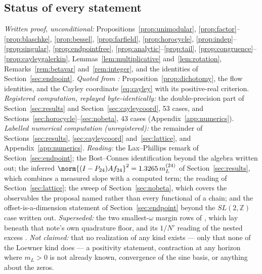 \subsection{Status of every statement}

\emph{Written proof, unconditional:} Propositions~\ref{prop:unimodular},
\ref{prop:factor}--\ref{prop:blaschke}, \ref{prop:bessel}, \ref{prop:farfield},
\ref{prop:horocycle}, \ref{prop:indep}--\ref{prop:singular},
\ref{prop:endpointfree}, \ref{prop:analytic}--\ref{prop:tail},
\ref{prop:congruence}--\ref{prop:cayleygalerkin},
Lemmas~\ref{lem:multiplicative} and~\ref{lem:rotation}, Remarks~\ref{rem:betavar} and~\ref{rem:integer},
and the identities of Section~\ref{sec:endpoint}.
\emph{Quoted from \cite{WilsonLines}:} Proposition~\ref{prop:dichotomy}, the
flow identities, and the Cayley coordinate \eqref{eq:cayley} with its
positive-real criterion. \emph{Registered computation, replayed
byte-identically:} the double-precision part of Section~\ref{sec:results} and
Section~\ref{sec:cayleycoord}, 53 cases, and
Sections~\ref{sec:horocycle}--\ref{sec:nobeta}, 43 cases
(Appendix~\ref{app:numerics}).
\emph{Labelled numerical computation (unregistered):} the remainder of
Sections~\ref{sec:results}, \ref{sec:cayleycoord} and~\ref{sec:lattice}, and
Appendix~\ref{app:numerics}. \emph{Reading:} the Lax--Phillips remark of
Section~\ref{sec:endpoint}; the Bost--Connes identification beyond the algebra
written out; the inferred $\norm{(I-P_{24})Af_{24}}^2=1.3265\,m_L^{(24)}$ of
Section~\ref{sec:results}, which combines a measured slope with a computed term;
the reading of Section~\ref{sec:lattice}; the sweep of
Section~\ref{sec:nobeta}, which covers the observables the proposal named rather
than every functional of a chain; and the offset-is-a-dimension statement of
Section~\ref{sec:endpoint} beyond the $SL(2,\mathbb Z)$ case written out. \emph{Superseded:} the two
smallest-$\omega$ margin rows of \cite[Table~3.1]{ContractionNote}, which lay
beneath that note's own quadrature floor, and its $1/N'$ reading of the nested
excess \cite{RegisteredNote}. \emph{Not claimed:} that no realization of any kind
exists --- only that none of the Loewner kind does --- a positivity statement, contraction at any horizon where $m_L>0$ is not already
known, convergence of the sine basis, or anything about the zeros.
